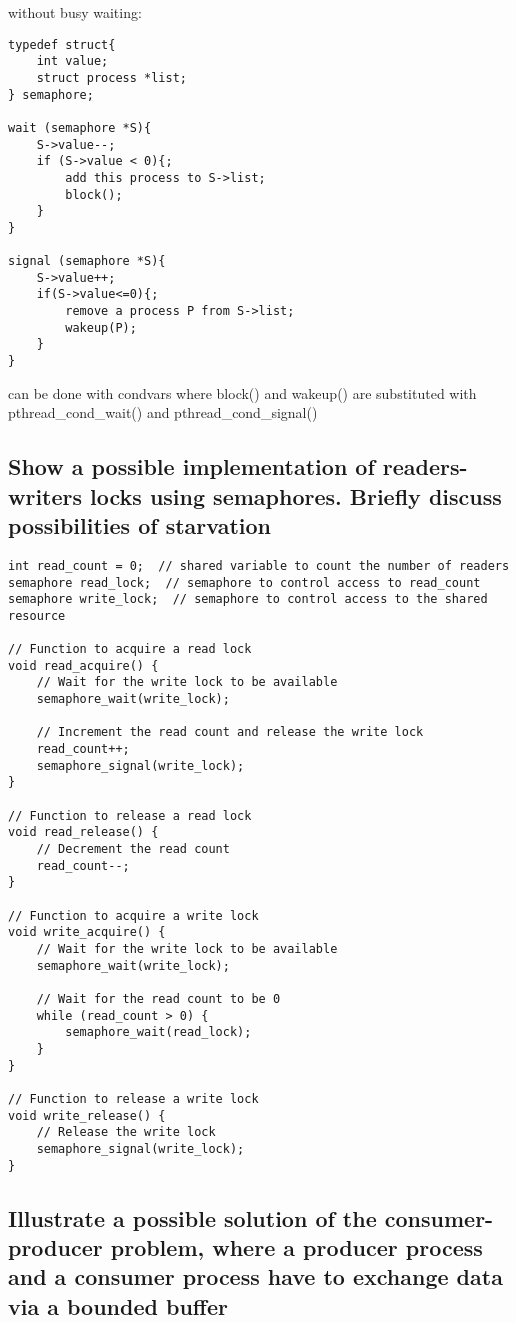 \documentclass{article}
\begin{document}
without busy waiting:

\begin{verbatim}
typedef struct{
    int value;
    struct process *list;
} semaphore;

wait (semaphore *S){
    S->value--;
    if (S->value < 0){;
        add this process to S->list;
        block();
    }
}

signal (semaphore *S){
    S->value++;
    if(S->value<=0){;
        remove a process P from S->list;
        wakeup(P);
    }
}
\end{verbatim}
can be done with condvars where block() and wakeup() are substituted with pthread\_cond\_wait() and pthread\_cond\_signal()


\subsection{Show a possible implementation of readers-writers locks using semaphores. Briefly discuss possibilities of starvation}
\begin{verbatim}
int read_count = 0;  // shared variable to count the number of readers
semaphore read_lock;  // semaphore to control access to read_count
semaphore write_lock;  // semaphore to control access to the shared resource

// Function to acquire a read lock
void read_acquire() {
    // Wait for the write lock to be available
    semaphore_wait(write_lock);

    // Increment the read count and release the write lock
    read_count++;
    semaphore_signal(write_lock);
}

// Function to release a read lock
void read_release() {
    // Decrement the read count
    read_count--;
}

// Function to acquire a write lock
void write_acquire() {
    // Wait for the write lock to be available
    semaphore_wait(write_lock);

    // Wait for the read count to be 0
    while (read_count > 0) {
        semaphore_wait(read_lock);
    }
}

// Function to release a write lock
void write_release() {
    // Release the write lock
    semaphore_signal(write_lock);
}
\end{verbatim}

\subsection{Illustrate a possible solution of the consumer-producer problem, where a producer process and a consumer process have to exchange data via a bounded buffer}
\end{document}
